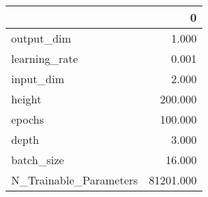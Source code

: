 \begin{tabular}{lr}
\toprule
{} &          0 \\
\midrule
output\_dim             &      1.000 \\
learning\_rate          &      0.001 \\
input\_dim              &      2.000 \\
height                 &    200.000 \\
epochs                 &    100.000 \\
depth                  &      3.000 \\
batch\_size             &     16.000 \\
N\_Trainable\_Parameters &  81201.000 \\
\bottomrule
\end{tabular}
